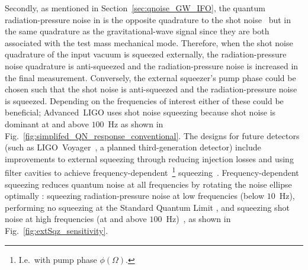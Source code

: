 Secondly, as mentioned in Section~\ref{sec:qnoise_GW_IFO}, the quantum radiation-pressure noise in is the opposite quadrature to the shot noise~\cite{}  but in the same quadrature as the gravitational-wave signal since they are both associated with the test mass mechanical mode. Therefore, when the shot noise quadrature of the input vacuum is squeezed externally, the radiation-pressure noise quadrature is anti-squeezed and the radiation-pressure noise is increased in the final measurement. Conversely, the external squeezer's pump phase could be chosen such that the shot noise is anti-squeezed and the radiation-pressure noise is squeezed. Depending on the frequencies of interest either of these could be beneficial; Advanced~LIGO uses shot noise squeezing because shot noise is dominant at and above $100$~Hz as shown in Fig.~\ref{fig:simplifed_QN_response_conventional}. The designs for future detectors (such as LIGO~Voyager~\cite{}, a planned third-generation detector) include improvements to external squeezing through reducing injection losses and using filter cavities to achieve frequency-dependent~\footnote{I.e.\ with pump phase $\phi(\Omega)$.} squeezing~\cite{}. Frequency-dependent squeezing reduces quantum noise at all frequencies by rotating the noise ellipse optimally : squeezing radiation-pressure noise at low frequencies (below $10$~Hz), performing no squeezing at the Standard Quantum Limit , and squeezing shot noise at high frequencies (at and above $100$~Hz)~\cite{}, as shown in Fig.~\ref{fig:extSqz_sensitivity}. 
